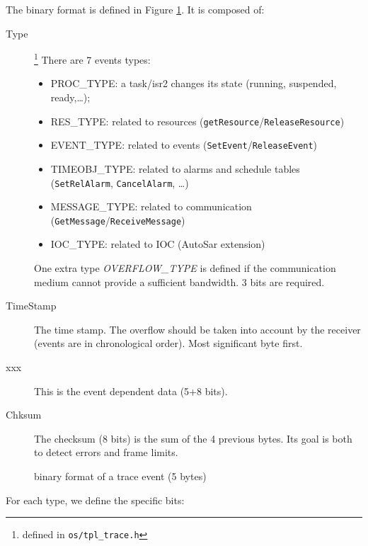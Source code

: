 The binary format is defined in Figure \ref{fig:traceBin}. It is composed of:
\begin{description}
	\item[Type]\footnote{defined in \lstinline{os/tpl_trace.h}} There are 7 events types: 
		\begin{itemize}
			\item PROC\_TYPE: a task/isr2 changes its state (running, suspended, ready,…);
			\item RES\_TYPE: related to resources (\lstinline{getResource}/\lstinline{ReleaseResource})
			\item EVENT\_TYPE: related to events (\lstinline{SetEvent}/\lstinline{ReleaseEvent})
			\item TIMEOBJ\_TYPE: related to alarms and schedule tables (\lstinline{SetRelAlarm}, \lstinline{CancelAlarm}, …)
			\item MESSAGE\_TYPE: related to communication (\lstinline{GetMessage}/\lstinline{ReceiveMessage})
			\item IOC\_TYPE: related to IOC (AutoSar extension) 
		\end{itemize}
		One extra type \emph{OVERFLOW\_TYPE} is defined if the communication medium cannot provide a sufficient bandwidth. 3 bits are required.
	\item[TimeStamp] The time stamp. The overflow should be taken into account by the receiver (events are in chronological order). Most significant byte first.
	\item[xxx] This is the event dependent data (5+8 bits).
	\item[Chksum] The checksum (8 bits) is the sum of the 4 previous bytes. Its goal is both to detect errors and frame limits.
\end{description}

\begin{figure}[htbp]
    \centering
	\begin{adjustbox}{width=.8\linewidth,keepaspectratio}
		
	\end{adjustbox}
	\caption{binary format of a trace event (5 bytes)}
	\label{fig:traceBin}
\end{figure}

For each type, we define the specific bits:

